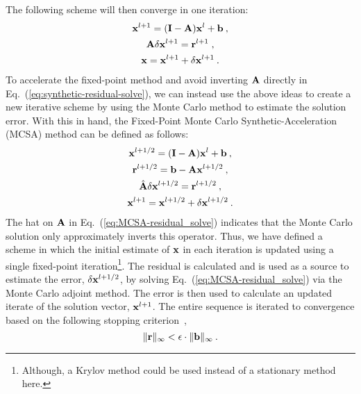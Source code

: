 The following scheme will then converge in one iteration:
\begin{subequations}
  \begin{gather}
    \mathbf{x}^{l+1} = (\mathbf{I} - \mathbf{A})\mathbf{x}^l + \mathbf{b}\:,\\
    \mathbf{A} \delta \mathbf{x}^{l+1} = \mathbf{r}^{l+1}\;,
    \label{eq:synthetic-residual-solve}\\ 
    \mathbf{x}=\mathbf{x}^{l+1}+\delta\mathbf{x}^{l+1}\:.
  \end{gather}
\end{subequations}
To accelerate the fixed-point method and avoid inverting $\mathbf{A}$ directly in
Eq.~(\ref{eq:synthetic-residual-solve}), we can instead use the above ideas to
create a new iterative scheme by using the Monte Carlo method to estimate the
solution error. With this in hand, the Fixed-Point Monte Carlo
Synthetic-Acceleration (MCSA) method can be defined as follows:
\begin{subequations}
  \begin{gather}
    \mathbf{x}^{l+1/2} = (\mathbf{I} - \mathbf{A})\mathbf{x}^l + \mathbf{b}\:,\\
    \mathbf{r}^{l+1/2} = \mathbf{b} - \mathbf{A}\mathbf{x}^{l+1/2}\:,
    \label{eq:MCSA-residual}\\     
    \hat{\mathbf{A}}\delta\mathbf{x}^{l+1/2} = \mathbf{r}^{l+1/2}\:,
    \label{eq:MCSA-residual_solve}\\ 
    \mathbf{x}^{l+1}=\mathbf{x}^{l+1/2}+\delta\mathbf{x}^{l+1/2}\:.
  \end{gather}
\end{subequations}
The hat on $\mathbf{A}$ in Eq.~(\ref{eq:MCSA-residual_solve}) indicates that the
Monte Carlo solution only approximately inverts this operator.  Thus, we
have defined a scheme in which the initial estimate of $\mathbf{x}$ in each iteration
is updated using a single fixed-point iteration\footnote{Although, a Krylov
  method could be used instead of a stationary method here.}.  The residual is
calculated and is used as a source to estimate the error, $\delta\mathbf{x}^{l+1/2}$,
by solving Eq.~(\ref{eq:MCSA-residual_solve}) via the Monte Carlo adjoint
method. The error is then used to calculate an updated iterate of the solution
vector, $\mathbf{x}^{l+1}$.  The entire sequence is iterated to convergence based on
the following stopping criterion~\cite{kelley_1995},
\begin{equation}
  \|\mathbf{r}\|_{\infty} < \epsilon\cdot\|\mathbf{b}\|_\infty\:.
  \label{eq:stopping-criteria}
\end{equation}


